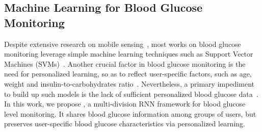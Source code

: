 \subsection{Machine Learning for Blood Glucose Monitoring}
Despite extensive research on mobile sensing~\cite{bib:COMMAG10:Lane10}, most works on blood glucose monitoring leverage simple machine learning techniques such as Support Vector Machines (SVMs)~\cite{bib:MAIHA14:Plis}.
Another crucial factor in blood glucose monitoring is the need for personalized learning, so as to reflect user-specific factors, such as age, weight and insulin-to-carbohydrates ratio~\cite{bib:IJNMBE16:Oviedo}.
Nevertheless, a primary impediment to build up such models is the lack of sufficient personalized blood glucose data~\cite{bib:KDHealth16:Marling}.
In this work, we propose \modelname, a multi-division RNN framework for blood glucose level monitoring.
It shares blood glucose information among groups of users, but preserves user-specific blood glucose characteristics via personalized learning.



